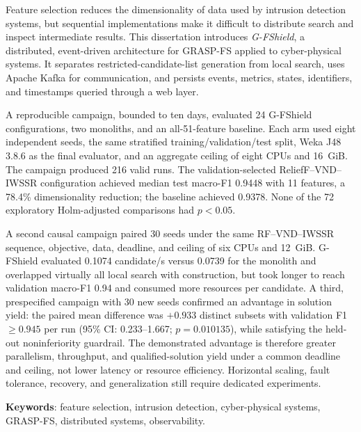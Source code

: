 \begin{resumo}[Abstract]

Feature selection reduces the dimensionality of data used by intrusion detection systems, but sequential implementations make it difficult to distribute search and inspect intermediate results. This dissertation introduces \textit{G-FShield}, a distributed, event-driven architecture for GRASP-FS applied to cyber-physical systems. It separates restricted-candidate-list generation from local search, uses Apache Kafka for communication, and persists events, metrics, states, identifiers, and timestamps queried through a web layer.

A reproducible campaign, bounded to ten days, evaluated 24 G-FShield configurations, two monoliths, and an all-51-feature baseline. Each arm used eight independent seeds, the same stratified training/validation/test split, Weka J48 3.8.6 as the final evaluator, and an aggregate ceiling of eight CPUs and 16~GiB. The campaign produced 216 valid runs. The validation-selected ReliefF--VND--IWSSR configuration achieved median test macro-F1 0.9448 with 11 features, a 78.4\% dimensionality reduction; the baseline achieved 0.9378. None of the 72 exploratory Holm-adjusted comparisons had $p<0.05$.

A second causal campaign paired 30 seeds under the same RF--VND--IWSSR sequence, objective, data, deadline, and ceiling of six CPUs and 12~GiB. G-FShield evaluated 0.1074 candidate/s versus 0.0739 for the monolith and overlapped virtually all local search with construction, but took longer to reach validation macro-F1 0.94 and consumed more resources per candidate. A third, prespecified campaign with 30 new seeds confirmed an advantage in solution yield: the paired mean difference was $+0.933$ distinct subsets with validation F1 $\geq 0.945$ per run (95\% CI: 0.233--1.667; $p=0.010135$), while satisfying the held-out noninferiority guardrail. The demonstrated advantage is therefore greater parallelism, throughput, and qualified-solution yield under a common deadline and ceiling, not lower latency or resource efficiency. Horizontal scaling, fault tolerance, recovery, and generalization still require dedicated experiments.

\noindent
\textbf{Keywords}: feature selection, intrusion detection, cyber-physical systems, GRASP-FS, distributed systems, observability.

\end{resumo}
